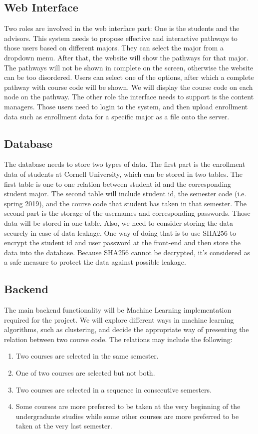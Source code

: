 \documentclass{article}
\begin{document}
\subsection{Web Interface}
Two roles are involved in the web interface part:  One is the students and the advisors. This system needs to propose effective and interactive pathways to those users based on different majors. They can select the major from a dropdown menu. After that, the website will show the pathways for that major. The pathways will not be shown in complete on the screen, otherwise the website can be too disordered. Users can select one of the options, after which a complete pathway with course code will be shown. We will display the course code on each node on the pathway. The other role the interface needs to support is the content managers. Those users need to login to the system, and then upload enrollment data such as enrollment data for a specific major as a file onto the server.

\subsection{Database}
The database needs to store two types of data. The first part is the enrollment data of students at Cornell University, which can be stored in two tables. The first table is one to one relation between student id and the corresponding student major. The second table will include student id, the semester code (i.e. spring 2019), and the course code that student has taken in that semester. The second part is the storage of the usernames and corresponding passwords. Those data will be stored in one table. Also, we need to consider storing the data securely in case of data leakage. One way of doing that is to use SHA256 to encrypt the student id and user password at the front-end and then store the data into the database. Because SHA256 cannot be decrypted, it’s considered as a safe measure to protect the data against possible leakage.

\subsection{Backend}
The main backend functionality will be Machine Learning implementation required for the project. We will explore different ways in machine learning algorithms, such as clustering, and decide the appropriate way of presenting the relation between two course code. The relations may include the following:
\begin{enumerate}
    \item Two courses are selected in the same semester.
    \item One of two courses are selected but not both.
    \item Two courses are selected in a sequence in consecutive semesters.
    \item Some courses are more preferred to be taken at the very beginning of the undergraduate studies while some other courses are more preferred to be taken at the very last semester.
\end{enumerate}
\end{document}
